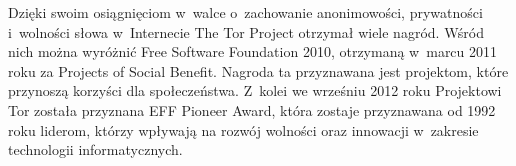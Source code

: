 Dzięki swoim osiągnięciom w~walce o~zachowanie anonimowości, prywatności i~wolności słowa w~Internecie The Tor Project otrzymał wiele nagród. Wśród nich można wyróżnić Free Software Foundation 2010, otrzymaną w~marcu 2011 roku za Projects of Social Benefit. Nagroda ta przyznawana jest projektom, które przynoszą korzyści dla społeczeństwa\cite{free_software_awards}. Z~kolei we wrześniu 2012 roku Projektowi Tor została przyznana EFF Pioneer Award, która zostaje przyznawana od 1992 roku liderom, którzy wpływają na rozwój wolności oraz innowacji w~zakresie technologii informatycznych\cite{eff_award}.